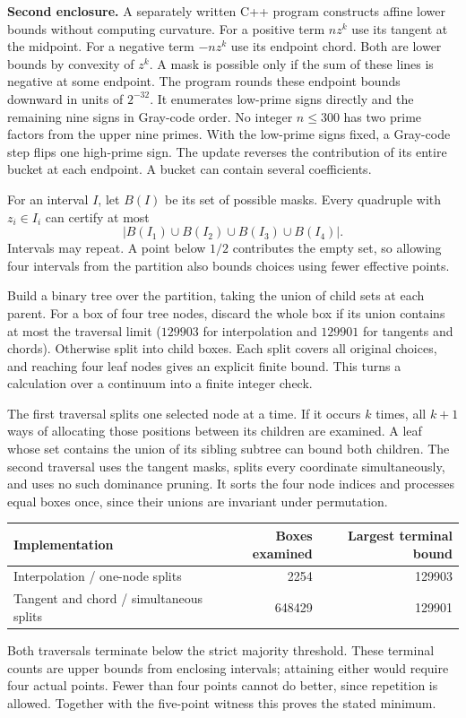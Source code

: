\documentclass[11pt]{article}
\newcommand{\sechead}[1]{\medskip{\large\bfseries #1}\par}
\begin{document}
\textbf{Second enclosure.} A separately written C++ program constructs affine lower bounds without computing curvature. For a positive term $nz^k$ use its tangent at the midpoint. For a negative term $-nz^k$ use its endpoint chord. Both are lower bounds by convexity of $z^k$. A mask is possible only if the sum of these lines is negative at some endpoint. The program rounds these endpoint bounds downward in units of $2^{-32}$. It enumerates low-prime signs directly and the remaining nine signs in Gray-code order. No integer $n\le300$ has two prime factors from the upper nine primes. With the low-prime signs fixed, a Gray-code step flips one high-prime sign. The update reverses the contribution of its entire bucket at each endpoint. A bucket can contain several coefficients.

\newpage
\sechead{6. Counting all choices of four points}
For an interval $I$, let $B(I)$ be its set of possible masks. Every quadruple with $z_i\in I_i$ can certify at most
\[
 \left|B(I_1)\cup B(I_2)\cup B(I_3)\cup B(I_4)\right|.
\]
Intervals may repeat. A point below $1/2$ contributes the empty set, so allowing four intervals from the partition also bounds choices using fewer effective points.

Build a binary tree over the partition, taking the union of child sets at each parent. For a box of four tree nodes, discard the whole box if its union contains at most the traversal limit ($129903$ for interpolation and $129901$ for tangents and chords). Otherwise split into child boxes. Each split covers all original choices, and reaching four leaf nodes gives an explicit finite bound. This turns a calculation over a continuum into a finite integer check.

The first traversal splits one selected node at a time. If it occurs $k$ times, all $k+1$ ways of allocating those positions between its children are examined. A leaf whose set contains the union of its sibling subtree can bound both children. The second traversal uses the tangent masks, splits every coordinate simultaneously, and uses no such dominance pruning. It sorts the four node indices and processes equal boxes once, since their unions are invariant under permutation.

\begin{center}\small
\begin{tabular}{lrr}
\toprule Implementation & Boxes examined & Largest terminal bound\\\midrule
Interpolation / one-node splits & 2254 & 129903\\
Tangent and chord / simultaneous splits & 648429 & 129901\\
\bottomrule
\end{tabular}
\end{center}
Both traversals terminate below the strict majority threshold. These terminal counts are upper bounds from enclosing intervals; attaining either would require four actual points. Fewer than four points cannot do better, since repetition is allowed. Together with the five-point witness this proves the stated minimum.
\end{document}
